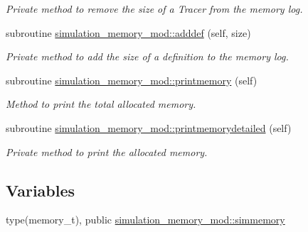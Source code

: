 \begin{DoxyCompactItemize}
\begin{DoxyCompactList}\small\item\em Private method to remove the size of a Tracer from the memory log. \end{DoxyCompactList}\item 
subroutine \mbox{\hyperlink{namespacesimulation__memory__mod_ac6d6853bc462947d24a8f6234d625138}{simulation\+\_\+memory\+\_\+mod\+::adddef}} (self, size)
\begin{DoxyCompactList}\small\item\em Private method to add the size of a definition to the memory log. \end{DoxyCompactList}\item 
subroutine \mbox{\hyperlink{namespacesimulation__memory__mod_a16a7a1c7e88fe5a5523d23f83f0e04a0}{simulation\+\_\+memory\+\_\+mod\+::printmemory}} (self)
\begin{DoxyCompactList}\small\item\em Method to print the total allocated memory. \end{DoxyCompactList}\item 
subroutine \mbox{\hyperlink{namespacesimulation__memory__mod_a894bd4ec7462fd634d328ee5be4c6483}{simulation\+\_\+memory\+\_\+mod\+::printmemorydetailed}} (self)
\begin{DoxyCompactList}\small\item\em Private method to print the allocated memory. \end{DoxyCompactList}\end{DoxyCompactItemize}
\subsection*{Variables}
\begin{DoxyCompactItemize}
\item 
type(memory\+\_\+t), public \mbox{\hyperlink{namespacesimulation__memory__mod_af3e2714796469b4b1ec247569b184088}{simulation\+\_\+memory\+\_\+mod\+::simmemory}}
\end{DoxyCompactItemize}
